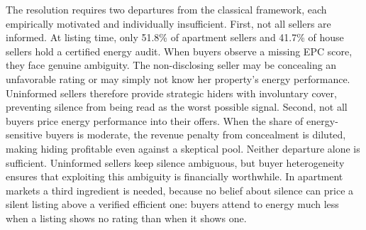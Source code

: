 The resolution requires two departures from the classical framework, each empirically motivated and individually insufficient. First, not all sellers are informed. At listing time, only 51.8\% of apartment sellers and 41.7\% of house sellers hold a certified energy audit. When buyers observe a missing EPC score, they face genuine ambiguity. The non-disclosing seller may be concealing an unfavorable rating or may simply not know her property's energy performance. Uninformed sellers therefore provide strategic hiders with involuntary cover, preventing silence from being read as the worst possible signal. Second, not all buyers price energy performance into their offers. When the share of energy-sensitive buyers is moderate, the revenue penalty from concealment is diluted, making hiding profitable even against a skeptical pool. Neither departure alone is sufficient. Uninformed sellers keep silence ambiguous, but buyer heterogeneity ensures that exploiting this ambiguity is financially worthwhile. In apartment markets a third ingredient is needed, because no belief about silence can price a silent listing above a verified efficient one: buyers attend to energy much less when a listing shows no rating than when it shows one. %
